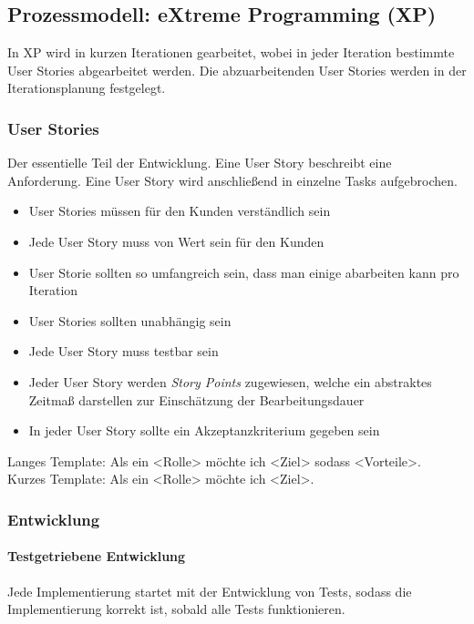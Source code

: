 		\subsection{Prozessmodell: eXtreme Programming (XP)}
			In XP wird in kurzen Iterationen gearbeitet, wobei in jeder Iteration bestimmte User Stories abgearbeitet werden. Die abzuarbeitenden User Stories werden in der Iterationsplanung festgelegt.

			\subsubsection{User Stories}
				Der essentielle Teil der Entwicklung. Eine User Story beschreibt eine Anforderung. Eine User Story wird anschließend in einzelne Tasks aufgebrochen.

				\begin{itemize}
					\item User Stories müssen für den Kunden verständlich sein
					\item Jede User Story muss von Wert sein für den Kunden
					\item User Storie sollten so umfangreich sein, dass man einige abarbeiten kann pro Iteration
					\item User Stories sollten unabhängig sein
					\item Jede User Story muss testbar sein
					\item Jeder User Story werden \textit{Story Points} zugewiesen, welche ein abstraktes Zeitmaß darstellen zur Einschätzung der Bearbeitungsdauer
					\item In jeder User Story sollte ein Akzeptanzkriterium gegeben sein
				\end{itemize}

				\noindent Langes Template: Als ein <Rolle> möchte ich <Ziel> sodass <Vorteile>. \\
				Kurzes Template: Als ein <Rolle> möchte ich <Ziel>.

			\subsubsection{Entwicklung}
				\paragraph{Testgetriebene Entwicklung}
					Jede Implementierung startet mit der Entwicklung von Tests, sodass die Implementierung korrekt ist, sobald alle Tests funktionieren.

